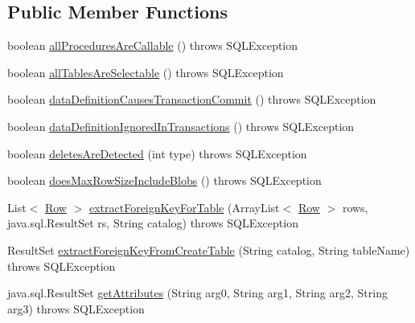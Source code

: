 \subsection*{Public Member Functions}
\begin{DoxyCompactItemize}
\item 
boolean \mbox{\hyperlink{classcom_1_1mysql_1_1cj_1_1jdbc_1_1_database_meta_data_a2b6b0b60b80c5bea15da284eeed3e8ec}{all\+Procedures\+Are\+Callable}} ()  throws S\+Q\+L\+Exception 
\item 
boolean \mbox{\hyperlink{classcom_1_1mysql_1_1cj_1_1jdbc_1_1_database_meta_data_a7e50917c8e8311e43527930167d79b50}{all\+Tables\+Are\+Selectable}} ()  throws S\+Q\+L\+Exception 
\item 
boolean \mbox{\hyperlink{classcom_1_1mysql_1_1cj_1_1jdbc_1_1_database_meta_data_a1c6698693e477a2dc7a76ef58fbc350a}{data\+Definition\+Causes\+Transaction\+Commit}} ()  throws S\+Q\+L\+Exception 
\item 
boolean \mbox{\hyperlink{classcom_1_1mysql_1_1cj_1_1jdbc_1_1_database_meta_data_a845084ae2565f8acc9b972b9a28f101d}{data\+Definition\+Ignored\+In\+Transactions}} ()  throws S\+Q\+L\+Exception 
\item 
boolean \mbox{\hyperlink{classcom_1_1mysql_1_1cj_1_1jdbc_1_1_database_meta_data_ada4d6165180e979eeb0645fadd72aaf9}{deletes\+Are\+Detected}} (int type)  throws S\+Q\+L\+Exception 
\item 
boolean \mbox{\hyperlink{classcom_1_1mysql_1_1cj_1_1jdbc_1_1_database_meta_data_ad8b1533935ccb3f77b745ccce44dd5b9}{does\+Max\+Row\+Size\+Include\+Blobs}} ()  throws S\+Q\+L\+Exception 
\item 
List$<$ \mbox{\hyperlink{interfacecom_1_1mysql_1_1cj_1_1result_1_1_row}{Row}} $>$ \mbox{\hyperlink{classcom_1_1mysql_1_1cj_1_1jdbc_1_1_database_meta_data_ae35d518bf4a260021412630e03b1c03f}{extract\+Foreign\+Key\+For\+Table}} (Array\+List$<$ \mbox{\hyperlink{interfacecom_1_1mysql_1_1cj_1_1result_1_1_row}{Row}} $>$ rows, java.\+sql.\+Result\+Set rs, String catalog)  throws S\+Q\+L\+Exception 
\item 
Result\+Set \mbox{\hyperlink{classcom_1_1mysql_1_1cj_1_1jdbc_1_1_database_meta_data_ab8cfbacd9dedbfa8fddc87a6925dc96b}{extract\+Foreign\+Key\+From\+Create\+Table}} (String catalog, String table\+Name)  throws S\+Q\+L\+Exception 
\item 
java.\+sql.\+Result\+Set \mbox{\hyperlink{classcom_1_1mysql_1_1cj_1_1jdbc_1_1_database_meta_data_a7b3b3d4717e6de73542b0df42becf8b6}{get\+Attributes}} (String arg0, String arg1, String arg2, String arg3)  throws S\+Q\+L\+Exception 

\end{DoxyCompactItemize}
